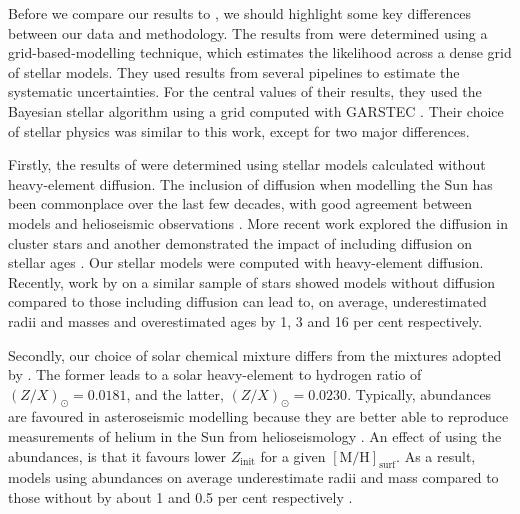\documentclass[a4paper,fleqn,usenatbib]{mnras}
\newcommand{\metallicity}{\ensuremath{[\mathrm{M}/\mathrm{H}]}}
\begin{document}
Before we compare our results to , we should highlight some key differences between our data and methodology. The results from  were determined using a grid-based-modelling technique, which estimates the likelihood across a dense grid of stellar models. They used results from several pipelines to estimate the systematic uncertainties. For the central values of their results, they used the Bayesian stellar algorithm \citep[BASTA;][]{SilvaAguirre.Davies.ea2015} using a grid computed with \textsc{GARSTEC} \citep{Weiss.Schlattl2008}. Their choice of stellar physics was similar to this work, except for two major differences.

Firstly, the results of  were determined using stellar models calculated without heavy-element diffusion. The inclusion of diffusion when modelling the Sun has been commonplace over the last few decades, with good agreement between models and helioseismic observations \citep{Christensen-Dalsgaard.Proffitt.ea1993, Bahcall.Pinsonneault.ea1995}. More recent work explored the diffusion in cluster stars \citep{Korn.Grundahl.ea2007, Onehag.Gustafsson.ea2014} and another demonstrated the impact of including diffusion on stellar ages \citep{Dotter.Conroy.ea2017}. Our stellar models were computed with heavy-element diffusion. Recently, work by \citet{Nsamba.Campante.ea2018} on a similar sample of stars showed models without diffusion compared to those including diffusion can lead to, on average, underestimated radii and masses and overestimated ages by 1, 3 and 16 per cent respectively.

Secondly, our choice of \citet{Asplund.Grevesse.ea2009} solar chemical mixture differs from the \citet{Grevesse.Sauval1998} mixtures adopted by . The former leads to a solar heavy-element to hydrogen ratio of $(Z/X)_\odot = 0.0181$, and the latter, $(Z/X)_\odot = 0.0230$. Typically, \citet{Grevesse.Sauval1998} abundances are favoured in asteroseismic modelling because they are better able to reproduce measurements of helium in the Sun from helioseismology \citep{Serenelli.Basu.ea2009}. An effect of using the \citet{Asplund.Grevesse.ea2009} abundances, is that it favours lower $Z_\mathrm{init}$ for a given $\metallicity_\mathrm{surf}$. As a result, models using \citet{Grevesse.Sauval1998} abundances on average underestimate radii and mass compared to those without by about 1 and 0.5 per cent respectively \citep{Nsamba.Campante.ea2018}.
\end{document}

